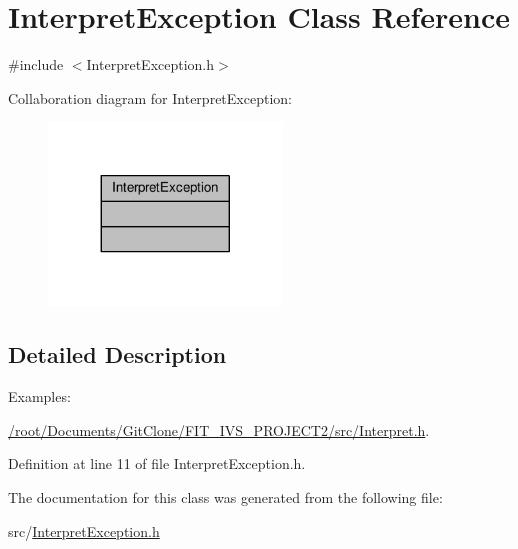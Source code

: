 \hypertarget{class_interpret_exception}{}\section{Interpret\+Exception Class Reference}
\label{class_interpret_exception}


{\ttfamily \#include $<$Interpret\+Exception.\+h$>$}



Collaboration diagram for Interpret\+Exception\+:
\nopagebreak
\begin{figure}[H]
\begin{center}
\leavevmode
\includegraphics[width=176pt]{class_interpret_exception__coll__graph}
\end{center}
\end{figure}


\subsection{Detailed Description}
\begin{Desc}
\item[Examples\+: ]\par
\hyperlink{_2root_2_documents_2_git_clone_2_f_i_t__i_v_s__p_r_o_j_e_c_t2_2src_2_interpret_8h-example}{/root/\+Documents/\+Git\+Clone/\+F\+I\+T\+\_\+\+I\+V\+S\+\_\+\+P\+R\+O\+J\+E\+C\+T2/src/\+Interpret.\+h}.\end{Desc}


Definition at line 11 of file Interpret\+Exception.\+h.



The documentation for this class was generated from the following file\+:\begin{DoxyCompactItemize}
\item 
src/\hyperlink{_interpret_exception_8h}{Interpret\+Exception.\+h}\end{DoxyCompactItemize}
